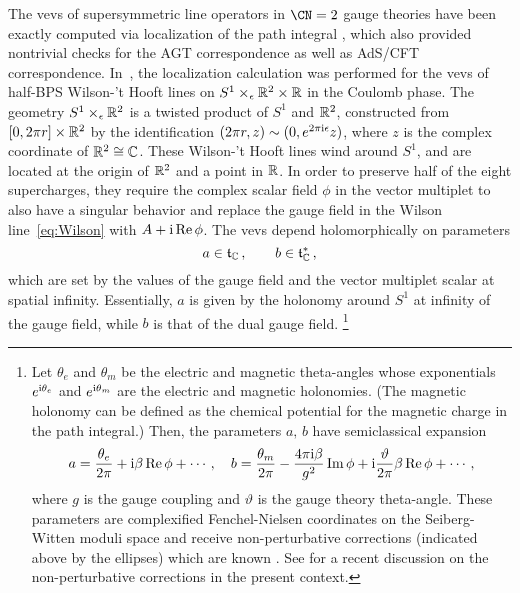 The vevs of supersymmetric line operators in $\CN=2$
gauge theories have been exactly computed via
localization of the path integral \cite{Pestun:2007rz,Gomis:2011pf},
which also provided nontrivial checks for the AGT correspondence
as well as AdS/CFT correspondence.
In~\cite{Ito:2011ea}, the localization calculation was performed
for the vevs of
half-BPS Wilson-'t Hooft lines on $S^1 \times_\epsilon \mathbb{R}^2 \times \mathbb{R}$ in
the Coulomb phase.
The geometry $S^1 \times_\epsilon \mathbb{R}^2$ is a twisted product of $S^1$ and
$\mathbb{R}^2$, constructed from $[0,2\pi r] \times \mathbb{R}^2$ by the
identification $(2\pi r,z) \sim (0, e^{2\pi\mathrm{i}\epsilon} z)$, where $z$ is
the complex coordinate of $\mathbb{R}^2 \cong \mathbb{C}$.  These Wilson-'t Hooft
lines wind around $S^1$, and are located at the origin of $\mathbb{R}^2$ and a
point in $\mathbb{R}$.  In order to preserve half of the eight supercharges,
they require the complex scalar field $\phi$ in the vector multiplet
to also have a singular behavior and replace the gauge field in the
Wilson line~\eqref{eq:Wilson} with $A + \mathrm{i}\mathop{\mathrm{Re}}\nolimits\phi$.  The vevs depend
holomorphically on parameters
\begin{equation}
  a \in \mathfrak{t}_{\mathbb{C}} \,,
  \qquad
  b \in \mathfrak{t}^*_{\mathbb{C}} \,,
\end{equation}
which are set by the values of the gauge field and the vector
multiplet scalar at spatial infinity.  Essentially, $a$ is given by
the holonomy around $S^1$ at infinity of the gauge field, while $b$ is
that of the dual gauge field.%
%
\footnote{Let $\theta_e$ and $\theta_m$ be the electric and magnetic theta-angles
whose exponentials $e^{\mathrm{i}\theta_e}$ and $e^{\mathrm{i}\theta_m}$ are the electric and magnetic holonomies.
(The magnetic holonomy can be defined as the chemical potential for the magnetic charge in the path integral.)
Then, the parameters $a,\,b$ have semiclassical expansion
\begin{equation}
  a = \frac{\theta_e}{2\pi} + \mathrm{i}\beta\mathop{\mathrm{Re}}\nolimits\phi + \cdots,
  \quad
  b = \frac{\theta_m}{2\pi} - \frac{4\pi\mathrm{i}\beta}{g^2}\mathop{\mathrm{Im}}\nolimits\phi + \mathrm{i}\frac{\vartheta}{2\pi}\beta\mathop{\mathrm{Re}}\nolimits\phi + \cdots,
\end{equation}
where $g$ is the gauge coupling and $\vartheta$ is the gauge theory theta-angle.
These parameters are complexified Fenchel-Nielsen coordinates on the Seiberg-Witten moduli space
and receive non-perturbative corrections (indicated above by the ellipses)
which are known \cite{Gaiotto:2008cd}. See \cite{Brennan:2019hzm} for a recent discussion on the non-perturbative corrections
in the present context.}
%


